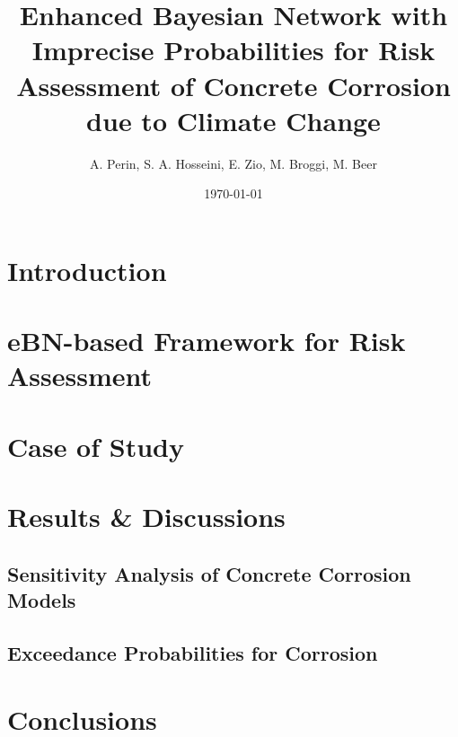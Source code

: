 \documentclass{article}
\title{Enhanced Bayesian Network with Imprecise Probabilities for Risk Assessment of Concrete Corrosion due to Climate Change}
\author{A. Perin, S. A. Hosseini, E. Zio, M. Broggi, M. Beer}
\date{\today}
\begin{document}
\maketitle


\begin{abstract}\label{abstract}
    
\end{abstract}

\section{Introduction}\label{introduction}
    

\section{eBN-based Framework for Risk Assessment}\label{ebn}
    
    
\section{Case of Study}\label{caseofstudy}
    

\section{Results \& Discussions}\label{results}
    \subsection{Sensitivity Analysis of Concrete Corrosion Models}
    \subsection{Exceedance Probabilities for Corrosion}

\section{Conclusions}\label{conclusions}

\newpage

\printbibliography{}
\end{document}
